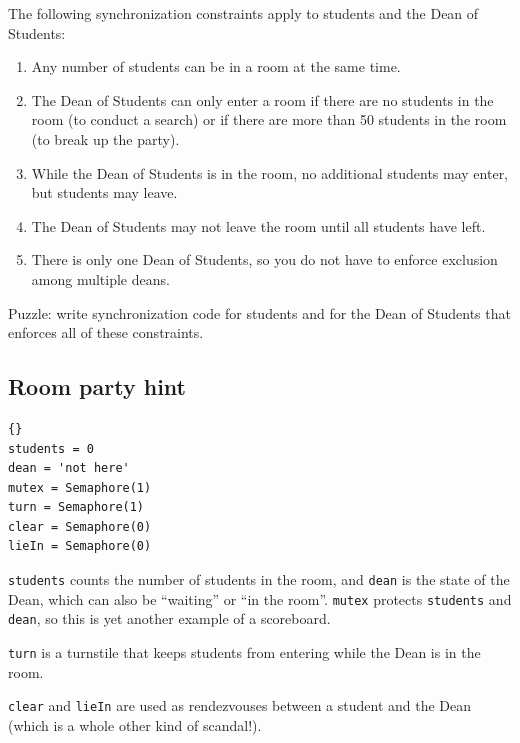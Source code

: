 \documentclass{book}
\newcommand{\clearemptydoublepage}{\newpage\cleardoublepage}
\begin{document}
The following synchronization constraints apply to students
and the Dean of Students:

\begin{enumerate}

\item Any number of students can be in a room at the same
time.

\item The Dean of Students can only enter a room if there
are no students in the room (to conduct a search) or if
there are more than 50 students in the room (to break up
the party).

\item While the Dean of Students is in the room, no additional
students may enter, but students may leave.

\item The Dean of Students may not leave the room until all
students have left.

\item There is only one Dean of Students, so you do not have
to enforce exclusion among multiple deans.

\end{enumerate}

Puzzle: write synchronization code for students and for the
Dean of Students that enforces all of these constraints.


\clearemptydoublepage
\subsection {Room party hint}

\begin{lstlisting}[title={Room party hint}]{}
students = 0                
dean = 'not here'           
mutex = Semaphore(1)
turn = Semaphore(1)
clear = Semaphore(0)
lieIn = Semaphore(0)
\end{lstlisting}

{\tt students} counts the number of students in the room,
and {\tt dean} is the state of the Dean, which can also be
``waiting'' or ``in the room''.
{\tt mutex} protects {\tt students} and {\tt dean}, so this
is yet another example of a scoreboard.

{\tt turn} is a turnstile that keeps students from entering
while the Dean is in the room.

{\tt clear} and {\tt lieIn} are used as rendezvouses between
a student and the Dean (which is a whole other kind of scandal!).


\clearemptydoublepage
\end{document}
